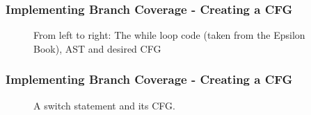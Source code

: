 \begin{frame}
\frametitle{Implementing Branch Coverage - Creating a CFG}

\begin{figure}
\centering
\begin{minipage}{.35\textwidth}
  \centering
  
\end{minipage}%
\begin{minipage}{.3\textwidth}
  \centering
\end{minipage}
\begin{minipage}{.24\textwidth}
  \centering
\end{minipage}
\caption{From left to right: The while loop code (taken from the Epsilon Book), AST and desired CFG}
\label{fig:while}
\end{figure}

\end{frame}

\begin{frame}
\frametitle{Implementing Branch Coverage - Creating a CFG}

\begin{figure}
\centering
\begin{minipage}{.44\textwidth}
  \centering
  
\end{minipage}%
\begin{minipage}{.55\textwidth}
  \centering
\end{minipage}
\caption{A switch statement and its CFG.}
\label{fig:switch2}
\end{figure}

\end{frame}
